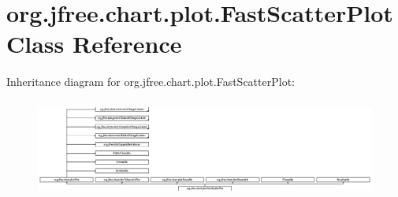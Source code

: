 \hypertarget{classorg_1_1jfree_1_1chart_1_1plot_1_1_fast_scatter_plot}{}\section{org.\+jfree.\+chart.\+plot.\+Fast\+Scatter\+Plot Class Reference}
\label{classorg_1_1jfree_1_1chart_1_1plot_1_1_fast_scatter_plot}
Inheritance diagram for org.\+jfree.\+chart.\+plot.\+Fast\+Scatter\+Plot\+:\begin{figure}[H]
\begin{center}
\leavevmode
\includegraphics[height=3.218391cm]{classorg_1_1jfree_1_1chart_1_1plot_1_1_fast_scatter_plot}
\end{center}
\end{figure}
